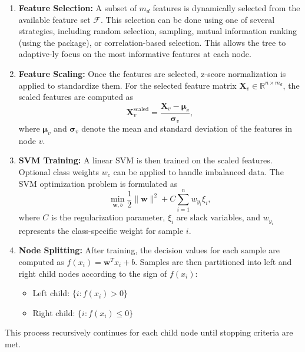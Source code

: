 \begin{enumerate}
\def\labelenumi{\arabic{enumi}.}
\item
  \textbf{Feature Selection:} A subset of \(m_d\) features is dynamically selected from the available feature set \(\mathcal{F}\). This selection can be done using one of several strategies, including random selection, sampling, mutual information ranking (using the  package), or correlation-based selection. This allows the tree to adaptive-ly focus on the most informative features at each node.
\item
  \textbf{Feature Scaling:} Once the features are selected, z-score normalization is applied to standardize them. For the selected feature matrix \(\mathbf{X}_v \in \mathbb{R}^{n \times m_d}\), the scaled features are computed as \[\mathbf{X}_v^{\text{scaled}} = \frac{\mathbf{X}_v - \boldsymbol{\mu}_v}{\boldsymbol{\sigma}_v},\] where \(\boldsymbol{\mu}_v\) and \(\boldsymbol{\sigma}_v\) denote the mean and standard deviation of the features in node \(v\).
\item
  \textbf{SVM Training:} A linear SVM is then trained on the scaled features. Optional class weights \(w_c\) can be applied to handle imbalanced data. The SVM optimization problem is formulated as \[\min_{\mathbf{w}, b} \frac{1}{2}\|\mathbf{w}\|^2 + C \sum_{i=1}^{n} w_{y_i} \xi_i,\] where \(C\) is the regularization parameter, \(\xi_i\) are slack variables, and \(w_{y_i}\) represents the class-specific weight for sample \(i\).
\item
  \textbf{Node Splitting:} After training, the decision values for each sample are computed as \(f(x_i) = \mathbf{w}^T x_i + b.\) Samples are then partitioned into left and right child nodes according to the sign of \(f(x_i)\):

  \begin{itemize}
  \item
    Left child: \(\{i : f(x_i) > 0\}\)
  \item
    Right child: \(\{i : f(x_i) \leq 0\}\)
  \end{itemize}
\end{enumerate}

This process recursively continues for each child node until stopping criteria are met.

